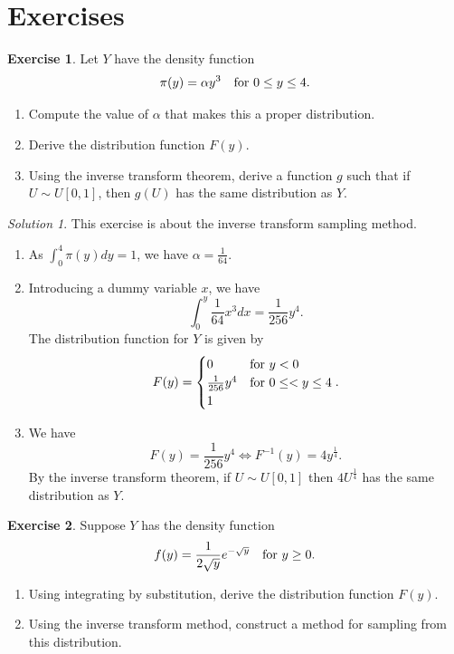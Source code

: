 \documentclass[
]{book}
\providecommand{\tightlist}{%
  \setlength{\itemsep}{0pt}\setlength{\parskip}{0pt}}
\theoremstyle{definition}
\theoremstyle{definition}
\theoremstyle{definition}
\newtheorem{exercise}{Exercise}[chapter]
\theoremstyle{definition}
\theoremstyle{remark}
\newtheorem*{solution}{Solution}
\begin{document}
\hypertarget{exercises-2}{%
\section{Exercises}\label{exercises-2}}

\begin{exercise}

Let \(Y\) have the density function
\[
\pi(y) = \alpha y^3 \quad \hbox{for } 0 \leq y \leq 4.
\]

\begin{enumerate}
\def\labelenumi{\arabic{enumi}.}
\tightlist
\item
  Compute the value of \(\alpha\) that makes this a proper distribution.
\item
  Derive the distribution function \(F(y)\).
\item
  Using the inverse transform theorem, derive a function \(g\) such that if \(U \sim U[0, 1]\), then \(g(U)\) has the same distribution as \(Y\).
\end{enumerate}

\end{exercise}

\begin{solution}

This exercise is about the inverse transform sampling method.

\begin{enumerate}
\def\labelenumi{\arabic{enumi}.}
\tightlist
\item
  As \(\int_0^4 \pi(y) dy = 1\), we have \(\alpha = \frac{1}{64}\).
\item
  Introducing a dummy variable \(x\), we have
  \[
  \int_0^y \frac{1}{64}x^3dx = \frac{1}{256}y^4.
  \]
  The distribution function for \(Y\) is given by
  \[
  F(y) = \begin{cases}
  0 & \hbox{for } y < 0\\
  \frac{1}{256}y^4 & \hbox{for } 0 \leq < y \leq 4 \\
  1 
  \end{cases}.
  \]
\item
  We have
  \[
  F(y) = \frac{1}{256}y^4 \iff F^{-1}(y) = 4y^{\frac{1}{4}}. 
  \]
  By the inverse transform theorem, if \(U \sim U[0, 1]\) then \(4U^{\frac{1}{4}}\) has the same distribution as \(Y\).
\end{enumerate}

\end{solution}

\begin{exercise}

Suppose \(Y\) has the density function
\[
f(y) = \frac{1}{2\sqrt{y}}e^{-\sqrt{y}} \quad \hbox{for } y \geq 0.
\]

\begin{enumerate}
\def\labelenumi{\arabic{enumi}.}
\tightlist
\item
  Using integrating by substitution, derive the distribution function \(F(y)\).
\item
  Using the inverse transform method, construct a method for sampling from this distribution.
\end{enumerate}

\end{exercise}
\end{document}

